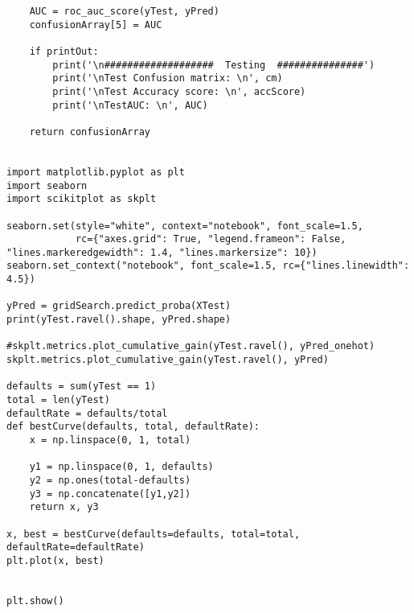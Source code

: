 \documentclass[%
oneside,                 %
final,                   %
10pt]{article}
\begin{document}
\begin{verbatim}
    AUC = roc_auc_score(yTest, yPred)
    confusionArray[5] = AUC
    
    if printOut:
        print('\n###################  Testing  ###############')
        print('\nTest Confusion matrix: \n', cm)
        print('\nTest Accuracy score: \n', accScore)
        print('\nTestAUC: \n', AUC)    
    
    return confusionArray


import matplotlib.pyplot as plt
import seaborn
import scikitplot as skplt

seaborn.set(style="white", context="notebook", font_scale=1.5, 
            rc={"axes.grid": True, "legend.frameon": False,
"lines.markeredgewidth": 1.4, "lines.markersize": 10})
seaborn.set_context("notebook", font_scale=1.5, rc={"lines.linewidth": 4.5})

yPred = gridSearch.predict_proba(XTest) 
print(yTest.ravel().shape, yPred.shape)

#skplt.metrics.plot_cumulative_gain(yTest.ravel(), yPred_onehot)
skplt.metrics.plot_cumulative_gain(yTest.ravel(), yPred)

defaults = sum(yTest == 1)
total = len(yTest)
defaultRate = defaults/total
def bestCurve(defaults, total, defaultRate):
    x = np.linspace(0, 1, total)
    
    y1 = np.linspace(0, 1, defaults)
    y2 = np.ones(total-defaults)
    y3 = np.concatenate([y1,y2])
    return x, y3

x, best = bestCurve(defaults=defaults, total=total, defaultRate=defaultRate)    
plt.plot(x, best)    


plt.show()

\end{verbatim}

\end{document}
